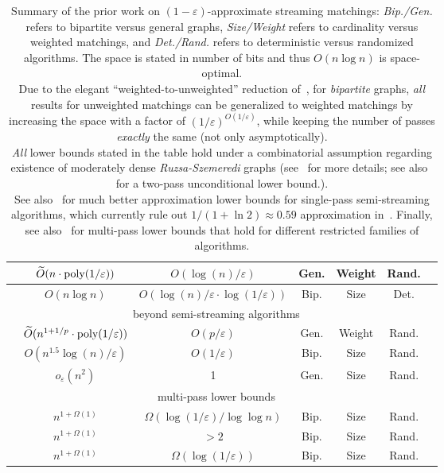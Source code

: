 \documentclass{article}
\newcommand{\Ot}{\widetilde{O}}
\newcommand{\eps}{\varepsilon}
\newcommand{\poly}{\mbox{\rm poly}}
\begin{document}
\begin{table}[h!]
{\begin{tabular}{|c | c | c | c | c | c | c |}
  \hline
  \cite{AhnG15} & $\Ot(n \cdot \poly{(1/\eps)})$ & $O(\log{\!(n)}/\eps)$ & Gen. & Weight & Rand. \\
  \hline
  \cite{AssadiJJST22} & $O(n\log{n})$ & $O(\log{\!(n)}/\eps \cdot \log{(1/\eps)})$ & Bip. & Size & Det. \\
   \hline\hline
  \multicolumn{6}{|c|}{beyond semi-streaming algorithms} \\
  \hline\hline
  \cite{AhnG15} & $\Ot(n^{1+1/p} \cdot \poly{(1/\eps)})$ & $O(p/\eps)$ & Gen. & Weight & Rand. \\
  \hline
  \cite{BehnezhadDETY17} & $O(n^{1.5}\log{\!(n)}/\eps)$ & $O(1/\eps)$ & Bip. & Size & Rand. \\
    \hline
  \cite{AssadiBKL23} & $o_{\eps}(n^2)$ & 1 & Gen. & Size & Rand. \\
   \hline\hline
  \multicolumn{6}{|c|}{multi-pass lower bounds} \\
\hline\hline  
 \cite{ChenKPSSY21} & $n^{1+\Omega(1)}$ & $\Omega({\log{(1/\eps)}}/{\log\log{n}})$ & Bip. & Size & Rand. \\
\hline
\cite{Assadi22} & $n^{1+\Omega(1)}$ & $>2$  & Bip. & Size & Rand. \\
\hline
\cite{AssadiS23} & $n^{1+\Omega(1)}$ & $\Omega(\log{(1/\eps)})$ &Bip. & Size & Rand. \\
\hline
\end{tabular}
}
\caption{\footnotesize Summary of the prior work on $(1-\eps)$-approximate streaming matchings: \emph{Bip./Gen.} refers to bipartite versus general graphs, \emph{Size/Weight} refers to cardinality versus weighted matchings, and \emph{Det./Rand.} refers to deterministic versus randomized algorithms. The space is stated in number of bits and thus $O(n\log{n})$ is space-optimal.\\ 
Due to the elegant ``weighted-to-unweighted'' reduction of~\cite{BernsteinDL21}, for \emph{bipartite} graphs, \emph{all} results for unweighted matchings can be generalized to weighted matchings by increasing the space with a factor of $(1/\eps)^{O(1/\eps)}$, 
while keeping the number of passes \emph{exactly} the same (not only asymptotically). \\ 
\emph{All}  lower bounds stated in the table hold under a combinatorial assumption regarding existence of moderately dense \emph{Ruzsa-Szemeredi} graphs (see~\cite{Assadi22,AssadiS23} for more details; see also~\cite{KonradN24}
for a two-pass unconditional lower bound.). \\
See also~\cite{GoelKK12,Kapralov13,Kapralov21} for much better approximation lower bounds for single-pass semi-streaming algorithms, which currently rule out $1/(1+\ln{2})\approx 0.59$ approximation in~\cite{Kapralov21}. 
Finally, see also~\cite{KhalilK20,KonradN21,KonradNS23} for multi-pass lower bounds that hold for different restricted families of algorithms.
}\label{tab:results}
\end{table} 
\end{document}
